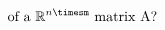 \documentclass[preview]{standalone}
\begin{document}
\begin{align*}
\text{of a } \mathbb{R}^{n\timesm} \text{ matrix A? }
\end{align*}
\end{document}
